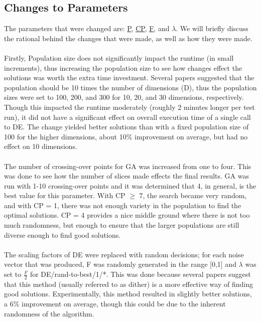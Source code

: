 \documentclass[paper=a4, fontsize=11pt]{scrartcl} %
\numberwithin{equation}{section} %
\numberwithin{figure}{section} %
\numberwithin{table}{section} %
\begin{document}
	\subsection{Changes to Parameters}\label{S21}
	 The parameters that were changed are: \hyperref[T21]{P}, \hyperref[T21]{CP}, \hyperref[T21]{F}, and \hyperref[T21]{$\lambda$}. We will briefly discuss the rational behind the changes that were made, as well as how they were made.\\
	 \\Firstly, Population size does not significantly impact the runtime (in small increments), thus increasing the population size to see how changes effect the solutions was worth the extra time investment. Several papers suggested that the population should be 10 times the number of dimensions (D), thus the population sizes were set to 100, 200, and 300 for 10, 20, and 30 dimensions, respectively. Though this impacted the runtime moderately (roughly 2 minutes longer per test run), it did not have a significant effect on overall execution time of a single call to DE. The change yielded better solutions than with a fixed population size of 100 for the higher dimensions, about 10\% improvement on average, but had no effect on 10 dimensions.\\
	 \\The number of crossing-over points for GA was increased from one to four. This was done to see how the number of slices made effects the final results. GA was run with 1-10 crossing-over points and it was determined that 4, in general, is the best value for this parameter. With CP $\ge$ 7, the search became very random, and with CP = 1, there was not enough variety in the population to find the optimal solutions. CP = 4 provides a nice middle ground where there is not too much randomness, but enough to ensure that the larger populations are still diverse enough to find good solutions. \\
	 \\The scaling factors of DE were replaced with random decisions; for each noise vector that was produced, F was randomly generated in the range [0,1] and $\lambda$ was set to $\frac{F}{2}$ for DE/rand-to-best/1/*. This was done because several papers suggest that this method (usually referred to as dither) is a more effective way of finding good solutions. Experimentally, this method resulted in slightly better solutions, a 6\% improvement on average, though this could be due to the inherent randomness of the algorithm.\\
	 	 
\end{document}
